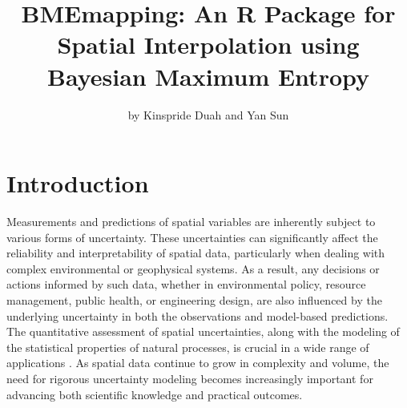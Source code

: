 \title{BMEmapping: An R Package for Spatial Interpolation using Bayesian Maximum Entropy}


\author{by Kinspride Duah and Yan Sun}

\maketitle


\section{Introduction}\label{introduction}

Measurements and predictions of spatial variables are inherently subject to various forms of uncertainty. These uncertainties can significantly affect the reliability and interpretability of spatial data, particularly when dealing with complex environmental or geophysical systems. As a result, any decisions or actions informed by such data, whether in environmental policy, resource management, public health, or engineering design, are also influenced by the underlying uncertainty in both the observations and model-based predictions. The quantitative assessment of spatial uncertainties, along with the modeling of the statistical properties of natural processes, is crucial in a wide range of applications \citep{bogaert1997spatiotemporal, christakos1998bayesian}. As spatial data continue to grow in complexity and volume, the need for rigorous uncertainty modeling becomes increasingly important for advancing both scientific knowledge and practical outcomes.

